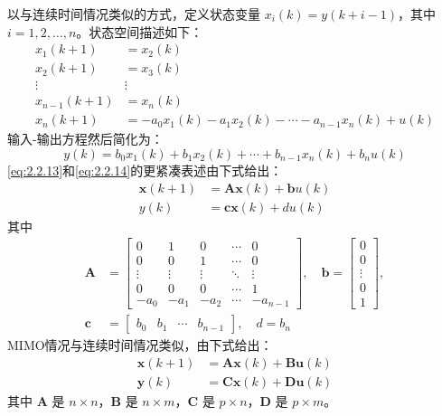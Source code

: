 \documentclass[UTF8,12pt,a4paper]{ctexart}
\theoremstyle{definition}
\begin{document}
以与连续时间情况类似的方式，定义状态变量 $x_i(k) = y(k+i-1)$，其中 $i=1,2,\ldots,n$。状态空间描述如下：
\begin{equation}\label{eq:2.2.13}
\begin{aligned}
x_1(k+1) &= x_2(k) \\
x_2(k+1) &= x_3(k) \\
\vdots & \vdots \\
x_{n-1}(k+1) &= x_n(k) \\
x_n(k+1) &= -a_0x_1(k) - a_1x_2(k) - \cdots - a_{n-1}x_n(k) + u(k)
\end{aligned}
\end{equation}
输入-输出方程然后简化为：
\begin{equation}\label{eq:2.2.14}
y(k) = b_0 x_1(k) + b_1 x_2(k) + \cdots + b_{n-1}x_n(k) + b_n u(k)
\end{equation}
\eqref{eq:2.2.13}和\eqref{eq:2.2.14}的更紧凑表述由下式给出：
\begin{equation}\label{eq:2.2.15}
\begin{aligned}
\mathbf{x}(k+1) &= \mathbf{A}\mathbf{x}(k) + \mathbf{b}u(k) \\
y(k) &= \mathbf{c}\mathbf{x}(k) + du(k)
\end{aligned}
\end{equation}
其中
\begin{equation}\label{eq:2.2.16}
\begin{aligned}
\mathbf{A} &= \begin{bmatrix}
0 & 1 & 0 & \cdots & 0 \\
0 & 0 & 1 & \cdots & 0 \\
\vdots & \vdots & \vdots & \ddots & \vdots \\
0 & 0 & 0 & \cdots & 1 \\
-a_0 & -a_1 & -a_2 & \cdots & -a_{n-1}
\end{bmatrix}, \quad
\mathbf{b} = \begin{bmatrix} 0 \\ 0 \\ \vdots \\ 0 \\ 1 \end{bmatrix}, \\
\mathbf{c} &= \begin{bmatrix} b_0 & b_1 & \cdots & b_{n-1} \end{bmatrix}, \quad d = b_n
\end{aligned}
\end{equation}
MIMO情况与连续时间情况类似，由下式给出：
\begin{equation}\label{eq:2.2.17}
\begin{aligned}
\mathbf{x}(k+1) &= \mathbf{A}\mathbf{x}(k) + \mathbf{B}\mathbf{u}(k) \\
\mathbf{y}(k) &= \mathbf{C}\mathbf{x}(k) + \mathbf{D}\mathbf{u}(k)
\end{aligned}
\end{equation}
其中 $\mathbf{A}$ 是 $n \times n$，$\mathbf{B}$ 是 $n \times m$，$\mathbf{C}$ 是 $p \times n$，$\mathbf{D}$ 是 $p \times m$。
\end{document}
